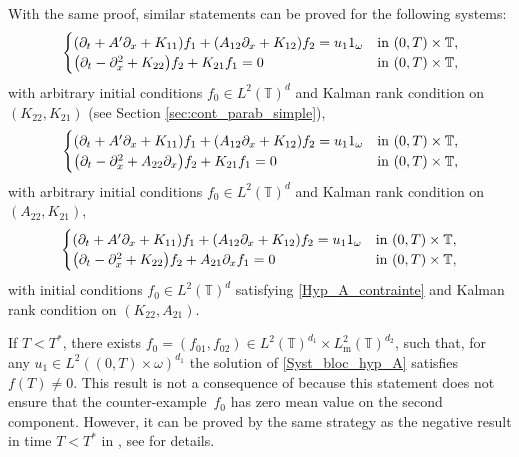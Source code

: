 \documentclass[JEP,XML,SOM,Unicode,NoEqCountersInSection]{cedram}
\theoremstyle{plain}
\theoremstyle{definition}
\theoremstyle{remark}
\newcommand{\set}{\mathbb}
\newcommand{\T}{\set{T}}
\newcommand{\m}{{\mathrm m}}
\let\originalleft\left
\let\originalright\right
\renewcommand{\left}{\mathopen{}\mathclose\bgroup\originalleft}
\renewcommand{\right}{\aftergroup\egroup\originalright}
\begin{document}
With the same proof, similar statements can be proved for the following systems:
\begin{equation} \label{Syst_bloc_hyp_K_0}
\begin{cases}
\left(\partial_t +A'\partial_x+K_{11}\right)f_1+\left(A_{12}\partial_x+K_{12}\right)f_2= u_1 1_\omega
&\text{in}\ (0,T)\times \T,\!\\
\left(\partial_t -\partial_x^2+K_{22}\right)f_2 + K_{21} f_1 = 0 &\text{in}\ (0,T)\times \T,\!\\
\end{cases}
\end{equation}
with arbitrary initial conditions $f_0\!\in\!L^2(\T)^d$ and Kalman rank condition on $(K_{22},K_{21})$ (see Section \ref{sec:cont_parab_simple}),
\begin{equation}
\begin{cases}
\left(\partial_t +A'\partial_x+K_{11}\right)f_1+\left(A_{12}\partial_x+K_{12}\right)f_2= u_1 1_\omega
&\text{in}\ (0,T)\times \T,\!\\
\left(\partial_t -\partial_x^2+A_{22} \partial_x \right)f_2 + K_{21} f_1 = 0 &\text{in}\ (0,T)\times \T,\!\\
\end{cases}
\end{equation}
with arbitrary initial conditions $f_0\!\in\!L^2(\T)^d$ and Kalman rank condition on $(A_{22},K_{21})$,%
\begin{equation}\label{Syst_bloc_K_0bis}
\begin{cases}
\left(\partial_t +A'\partial_x+K_{11}\right)f_1+\left(A_{12}\partial_x+K_{12}\right)f_2= u_1 1_\omega
&\text{in}\ (0,T)\times \T,\!\\
\left(\partial_t -\partial_x^2+K_{22} \right)f_2 + A_{21} \partial_x f_1 = 0 &\text{in}\ (0,T)\times \T,
\end{cases}
\end{equation}
with initial conditions $f_0 \in L^2(\T)^d$ satisfying \eqref{Hyp_A_contrainte} and Kalman rank condition on $(K_{22},A_{21})$.

If $T<T^*$, there exists $f_0=(f_{01},f_{02})\in L^2(\T)^{d_1} \times L^2_\m(\T)^{d_2}$, such that, for any \hbox{$u_1 \in L^2((0,T)\times\omega)^{d_1}$} the solution of \eqref{Syst_bloc_hyp_A} satisfies $f(T) \neq 0$. This result is not a consequence of  because this statement does not ensure that the counter-example~$f_0$ has zero mean value on the second component. However, it can be proved by the same strategy as the negative result in time $T<T^*$ in , see  for details.
\end{document}
